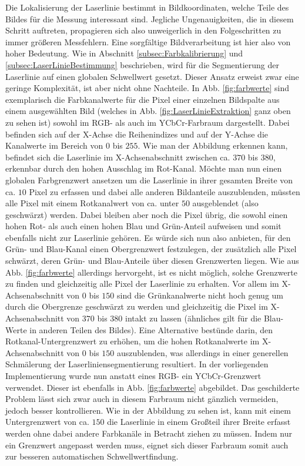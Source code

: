 Die Lokalisierung der Laserlinie bestimmt in Bildkoordinaten, welche Teile des Bildes für die Messung interessant sind. Jegliche Ungenauigkeiten, die in diesem Schritt auftreten, propagieren sich also unweigerlich in den Folgeschritten zu immer größeren Messfehlern. Eine sorgfältige Bildverarbeitung ist hier also von hoher Bedeutung.\newline
Wie in Abschnitt \ref{subsec:Farbkalibrierung} und \ref{subsec:LaserLinieBestimmung} beschrieben, wird für die Segmentierung der Laserlinie auf einen globalen Schwellwert gesetzt. Dieser Ansatz erweist zwar eine geringe Komplexität, ist aber nicht ohne Nachteile. In Abb. \ref{fig:farbwerte} sind exemplarisch die Farbkanalwerte für die Pixel einer einzelnen Bildspalte aus einem ausgewählten Bild (welches in Abb. \ref{fig:LaserLinieExtraktion} ganz oben zu sehen ist) sowohl im RGB- als auch im YCbCr-Farbraum dargestellt. Dabei befinden sich auf der X-Achse die Reihenindizes und auf der Y-Achse die Kanalwerte im Bereich von \(0\) bis \(255\). Wie man der Abbildung erkennen kann, befindet sich die Laserlinie im X-Achsenabschnitt zwischen ca. \(370\) bis \(380\), erkennbar durch den hohen Ausschlag im Rot-Kanal. Möchte man nun einen globalen Farbgrenzwert ansetzen um die Laserlinie in ihrer gesamten Breite von ca. \(10\) Pixel zu erfassen und dabei alle anderen Bildanteile auszublenden, müssten alle Pixel mit einem Rotkanalwert von ca. unter \(50\) ausgeblendet (also geschwärzt) werden. Dabei bleiben aber noch die Pixel übrig, die sowohl einen hohen Rot- als auch einen hohen Blau und Grün-Anteil aufweisen und somit ebenfalls nicht zur Laserlinie gehören. Es würde sich nun also anbieten, für den Grün- und Blau-Kanal einen Obergrenzwert festzulegen, der zusätzlich alle Pixel schwärzt, deren Grün- und Blau-Anteile über diesen Grenzwerten liegen. Wie aus Abb. \ref{fig:farbwerte} allerdings hervorgeht, ist es nicht möglich, solche Grenzwerte zu finden und gleichzeitig alle Pixel der Laserlinie zu erhalten. Vor allem im X-Achsenabschnitt von \(0\) bis \(150\) sind die Grünkanalwerte nicht hoch genug um durch die Obergrenze geschwärzt zu werden und gleichzeitig die Pixel im X-Achsenabschnitt von \(370\) bis \(380\) intakt zu lassen (ähnliches gilt für die Blau-Werte in anderen Teilen des Bildes). Eine Alternative bestünde darin, den Rotkanal-Untergrenzwert zu erhöhen, um die hohen Rotkanalwerte im X-Achsenabschnitt von \(0\) bis \(150\) auszublenden, was allerdings in einer generellen Schmälerung der Laserliniensegmentierung resultiert.\linebreak
In der vorliegenden Implementierung wurde nun anstatt eines RGB- ein YCbCr-Grenzwert verwendet. Dieser ist ebenfalls in Abb. \ref{fig:farbwerte} abgebildet. Das geschilderte Problem lässt sich zwar auch in diesem Farbraum nicht gänzlich vermeiden, jedoch besser kontrollieren. Wie in der Abbildung zu sehen ist, kann mit einem Untergrenzwert von ca. \(150\) die Laserlinie in einem Großteil ihrer Breite erfasst werden ohne dabei andere Farbkanäle in Betracht ziehen zu müssen. Indem nur ein Grenzwert angepasst werden muss, eignet sich dieser Farbraum somit auch zur besseren automatischen Schwellwertfindung.\newline
